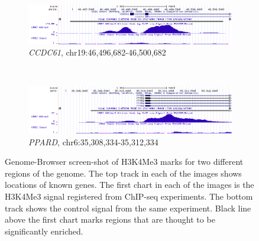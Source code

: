 \documentclass[12pt,a4paper]{article}
\begin{document}
\begin{figure}
    \centering
    \begin{subfigure}[b]{\textwidth}
        \centering
        \includegraphics[width=\textwidth]{images/introduction/genome_browser_ccdc61.png}
        \caption{\emph{CCDC61}, chr19:46,496,682-46,500,682}
        \label{fig:genome_browser_ccdc61}
    \end{subfigure}
    ~
    \begin{subfigure}[b]{\textwidth}
        \centering
        \includegraphics[width=\textwidth]{images/introduction/genome_browser_ppard.png}
        \caption{\emph{PPARD}, chr6:35,308,334-35,312,334}
        \label{fig:genome_browser_ppard}
    \end{subfigure}
    \caption{Genome-Browser screen-shot of H3K4Me3 marks for two different regions of the genome. The top track in each of the images shows locations of known genes. The first chart in each of the images is the H3K4Me3 signal registered from ChIP-seq experiments. The bottom track shows the control signal from the same experiment. Black line above the first chart marks regions that are thought to be significantly enriched.}
    \label{fig:different_marks}
\end{figure}
\end{document}
